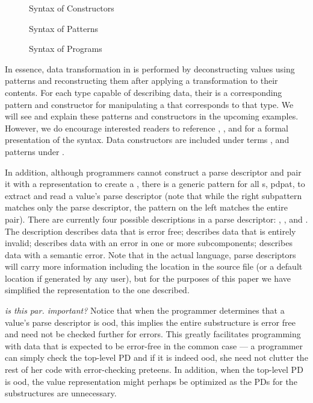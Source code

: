 \documentclass{entcs}
\begin{document}
\begin{figure}
  \centering
  
  \caption{Syntax of Constructors}
  \label{fig:syntax-terms}
\end{figure}

\begin{figure}
  \centering
  
  \caption{Syntax of Patterns}
  \label{fig:syntax-pat}
\end{figure}

\begin{figure}
  \centering
  
  \caption{Syntax of Programs}
  \label{fig:syntax-prog}
\end{figure}

In essence, data transformation in \datatype{} is performed by
deconstructing values using patterns and reconstructing them after
applying a transformation to their contents. For each type capable of
describing data, their is a corresponding pattern and constructor for
manipulating a \pvalue{} that corresponds to that type. We will see
and explain these patterns and constructors in the upcoming examples.
However, we do encourage interested readers to reference
, ,
 and  for a formal
presentation of the syntax. Data constructors are included under terms
, and patterns under .

In addition, although programmers cannot construct a parse descriptor
and pair it with a representation to create a \pvalue{}, there is a
generic pattern for all \pvalue{}s,  {pdpat}, to
extract and read a value's parse descriptor (note that while the right
subpattern matches only the parse descriptor, the pattern on the left
matches the entire pair). There are currently four possible
descriptions in a parse descriptor: \pdgood{}, \pdbad{},\pdnest{} and
\pdsem{}. The description \pdgood{} describes data that is error free;
\pdbad{} describes data that is entirely invalid; \pdnest{} describes
data with an error in one or more subcomponents; \pdsem{} describes
data with a semantic error.  Note that in the actual language, parse
descriptors will carry more information including the location in the
source file (or a default location if generated by any user), but for
the purposes of this paper we have simplified the representation to
the one described.

{\em is this par. important?}
Notice that when the programmer
determines that a value's parse descriptor is ood, this implies
the entire substructure is error free and need not be checked further
for errors.  This greatly facilitates programming with data that is
expected to be error-free in the common case --- a programmer can
simply check the top-level PD and if it is indeed ood, she need
not clutter the rest of her code with error-checking preteens.  In
addition, when the top-level PD is ood, the value representation
might perhaps be optimized as the PDs for the substructures are
unnecessary.
  
\end{document}
